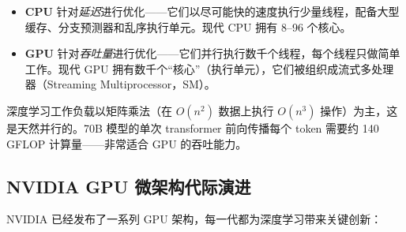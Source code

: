 \begin{intuitionbox}
\begin{itemize}
  \item \textbf{CPU} 针对\emph{延迟}进行优化——它们以尽可能快的速度执行少量线程，配备大型缓存、分支预测器和乱序执行单元。现代 CPU 拥有 8--96 个核心。
  \item \textbf{GPU} 针对\emph{吞吐量}进行优化——它们并行执行数千个线程，每个线程只做简单工作。现代 GPU 拥有数千个“核心”（执行单元），它们被组织成流式多处理器（Streaming Multiprocessor，SM）。
\end{itemize}

深度学习工作负载以矩阵乘法（在 $O(n^2)$ 数据上执行 $O(n^3)$ 操作）为主，这是天然并行的。70B 模型的单次 transformer 前向传播每个 token 需要约 140 GFLOP 计算量——非常适合 GPU 的吞吐能力。
\end{intuitionbox}

\subsection{NVIDIA GPU 微架构代际演进}
\label{nvidia-gpu-microarchitecture-generations}

NVIDIA 已经发布了一系列 GPU 架构，每一代都为深度学习带来关键创新：

